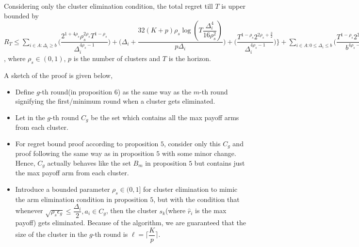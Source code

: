 \begin{proposition}
Considering only the cluster elimination condition, the total regret till $T$ is upper bounded by $R_{T}\leq \sum_{i\in A:\Delta_{i}\geq b}\bigg(\dfrac{2^{1+4\rho_{s}}\rho_{s}^{2\rho_{s}}T^{1-\rho_{s}}}{\Delta_{i}^{4\rho_{s}-1}}\bigg) + \bigg(\Delta_{i}+\dfrac{32(K+p)\rho_{s}\log{(T\dfrac{\Delta_{i}^{4}}{16\rho_{s}^{2}})}}{p\Delta_{i}}\bigg)  +  \bigg(\dfrac{T^{1-\rho_{s}}2^{2\rho_{s}+\frac{3}{2}}}{\Delta_{i}^{4\rho_{s} -1}} \bigg) \bigg \rbrace+\sum_{i\in A:0\leq\Delta_{i}\leq b}\bigg(\dfrac{T^{1-\rho_{s}}2^{2\rho_{s}+\frac{3}{2}}}{b^{4\rho_{s} -1}} \bigg) + max_{i:\Delta\leq b}\Delta_{i}T$, where $\rho_{s}\in (0,1)$, $p$ is the number of clusters and $T$ is the horizon.
\end{proposition}


\begin{remark} A sketch of the proof is given below,
\newline
\begin{itemize}
\item Define $g$-th round(in proposition 6) as the same way as the $m$-th round signifying the first/minimum round when a cluster gets eliminated.
\item Let in the $g$-th round $C_{g}$ be the set which contains all the max payoff arms from each cluster.
\item For regret bound proof according to proposition $5$, consider only this $C_{g}$ and proof following the same way as in proposition $5$ with some minor change. Hence, $C_{g}$ actually behaves like the set $B_{m}$ in proposition $5$ but contains just the max payoff arm from each cluster.
\item Introduce a bounded parameter $\rho_{s}\in (0,1]$ for cluster elimination to mimic the arm elimination condition in proposition $5$, but with the condition that whenever $\sqrt{\rho_{s}\epsilon_{g}}\leq \dfrac{\Delta_{i}}{2}, a_{i}\in C_{g}$, then the cluster $s_{k}$(where $\hat{r}_{i}$ is the max payoff) gets eliminated. Because of the algorithm, we are guaranteed that the size of the cluster in the $g$-th round is $\ell=\bigg\lceil \dfrac{K}{p}\bigg\rceil$.
\end{itemize}
\end{remark}

